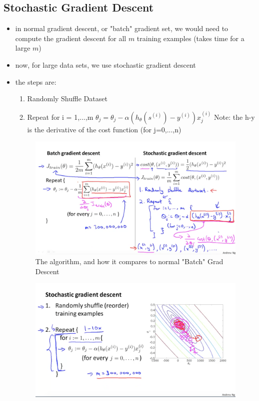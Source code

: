 \documentclass[]{article}
\begin{document}
	\subsection{Stochastic Gradient Descent}
		\begin{itemize}
			\item in normal gradient descent, or "batch" gradient set, we would need to compute the gradient descent for all $m$ training examples (takes time for a large $m$)
			\item now, for large data sets, we use stochastic gradient descent
			\item the steps are:
			\begin{enumerate}
				\item Randomly Shuffle Dataset
				\item Repeat {
					 	for i = 1,...,m {
					 		$\theta_j =\theta_j-\alpha(h_\theta(s^{(i)})-y^{(i)})x_j^{(i)}$	Note: the h-y is the derivative of the cost function
								(for j=0,...,n)
							}
						}
			\end{enumerate}
			\begin{figure}[ht!]
				\includegraphics[width= 1.5\textwidth,center]{Stochastic_Grad_Descent.png}
				\caption{The algorithm, and how it compares to normal "Batch" Grad Descent}
			\end{figure}
			\begin{figure}[ht!]
				\includegraphics[width= 1.5\textwidth,center]{Stochastic_Grad_Descent_Visualization.png}

\end{figure}
\end{itemize}
\end{document}
